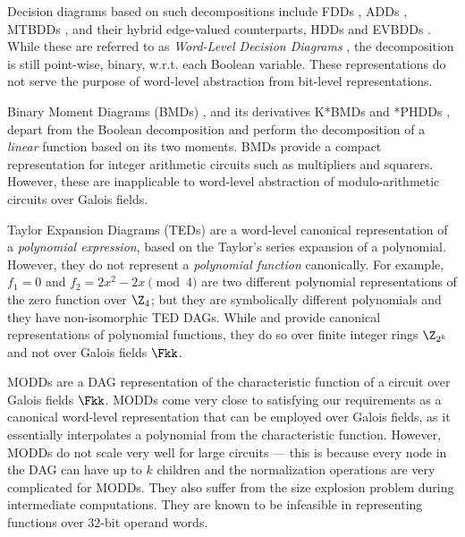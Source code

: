 Decision diagrams based on such decompositions include FDDs
\cite{okfdd}, ADDs \cite{add}, MTBDDs \cite{mtbdd}, and their hybrid 
edge-valued counterparts, HDDs \cite{hdd} and EVBDDs \cite{evbdd}. 
While these are referred to as {\it Word-Level Decision Diagrams}
\cite{WLS}, the decomposition is still point-wise, binary, 
w.r.t. each Boolean variable. These representations do not
serve the purpose of word-level abstraction from bit-level
representations. 

Binary Moment Diagrams (BMDs) \cite{bmd}, and its derivatives K*BMDs
\cite{kbmd} and *PHDDs \cite{phdd}, depart from the Boolean
decomposition and perform the decomposition of a {\it linear} function
based on its two moments. BMDs provide a compact representation for
integer arithmetic circuits such as multipliers and squarers. However,
these are inapplicable to word-level abstraction of modulo-arithmetic
circuits over Galois fields. 


Taylor Expansion Diagrams (TEDs) \cite{ted_tcomp} are a
word-level canonical representation of a {\it polynomial expression},
based on the Taylor's series expansion of a polynomial. However, they do
not represent a {\it polynomial function} canonically. For example,
$f_1 = 0$ and $f_2 = 2x^2 - 2x \pmod{ 4}$ are two different polynomial
representations of the zero function over $\Z_4$; but they are
symbolically different polynomials and they have non-isomorphic TED
DAGs.  While \cite{namrata:phd}  and \cite{alizadeh:tcad2010} provide 
canonical representations of polynomial functions, they do so over
finite integer rings $\Z_{2^k}$ and not over Galois fields $\Fkk$.


MODDs \cite{modd} \cite{modd_tcomp} are a DAG representation of the
characteristic function of a circuit over Galois fields $\Fkk$. MODDs
come very close to satisfying our requirements as a canonical
word-level representation that can be employed over Galois fields, as
it essentially interpolates a polynomial from the characteristic 
function. However, MODDs do not scale very well for large circuits ---
this is because every node in the DAG can have up to $k$ children and
the normalization operations are very complicated for MODDs. They also
suffer from the size explosion problem during intermediate
computations. They are known to be infeasible in representing
functions over $32$-bit operand words. 

